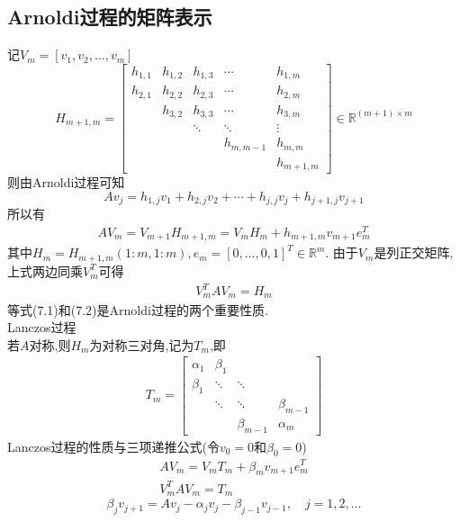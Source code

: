 \documentclass[12pt,a4paper]{article}
\begin{document}
\subsection*{Arnoldi过程的矩阵表示}
记$V_{m}=\left[v_{1}, v_{2}, \ldots, v_{m}\right]$
$$
H_{m+1, m}=\left[\begin{array}{ccccc}{h_{1,1}} & {h_{1,2}} & {h_{1,3}} & {\cdots} & {h_{1, m}} \\
{h_{2,1}} & {h_{2,2}} & {h_{2,3}} & {\cdots} & {h_{2, m}} \\ 
{} & {h_{3,2}} & {h_{3,3}} & {\cdots} & {h_{3, m}} \\
{} & {}&{\ddots} & {\ddots} & {\vdots} \\
{} & {} &{}& {h_{m, m-1}} & {h_{m, m}} \\
{} & {} &{}&{}& {h_{m+1, m}}
\end{array}\right] \in \mathbb{R}^{(m+1) \times m}
$$
则由Arnoldi过程可知
$$
A v_{j}=h_{1, j} v_{1}+h_{2, j} v_{2}+\cdots+h_{j, j} v_{j}+h_{j+1, j} v_{j+1}
$$
所以有
\begin{align*}
	A V_{m}=V_{m+1} H_{m+1, m}=V_{m} H_{m}+h_{m+1, m} v_{m+1} e_{m}^{T}
	\tag{7.1}
\end{align*}
其中$H_{m}=H_{m+1, m}(1 : m, 1 : m), e_{m}=[0, \ldots, 0,1]^{T} \in \mathbb{R}^{m}$.
由于$V_{m}$是列正交矩阵,上式两边同乘$V_{m}^{T}$可得
\begin{align*}
	V_{m}^{T} A V_{m}=H_{m}
	\tag{7.2}
\end{align*}
等式(7.1)和(7.2)是Arnoldi过程的两个重要性质.\\
Lanczos过程\\
若$A$对称,则$H_m$为对称三对角,记为$T_m$,即
\begin{align*}
	T_{m}=
	\left[\begin{array}{cccc}
		{\alpha_{1}} & {\beta_{1}} & {} & {} \\ 
		{\beta_{1}} & {\ddots} & {\ddots} & {} \\ 
		{} & {\ddots} & {\ddots} & {\beta_{m-1}} \\ 
		{} & {} & {\beta_{m-1}} & {\alpha_{m}}
	\end{array}\right]
	\tag{7.3}
\end{align*}
Lanczos过程的性质与{\color{blue}三项递推公式}(令$v_{0}=0$和$\beta_{0}=0$)
\begin{align*}
	{A V_{m}=V_{m} T_{m}+\beta_{m} v_{m+1} e_{m}^{T}}\tag{7.4}\\ 
	{V_{m}^{T} A V_{m}=T_{m}}\tag{7.5}
\end{align*}
$$
\beta_{j} v_{j+1}=A v_{j}-\alpha_{j} v_{j}-\beta_{j-1} v_{j-1}, \quad j=1,2, \ldots
$$
\end{document}
